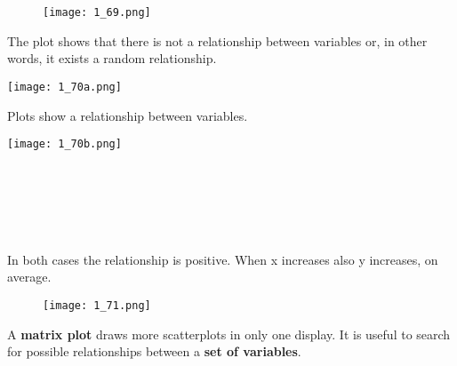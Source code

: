 \begin{frame}
  \begin{figure}
    \centering
    \texttt{[image: 1\_69.png]}
  \end{figure}
  \vspace*{.2cm}
  The plot shows that there is not a relationship between variables or, in other words, it exists a random relationship.
\end{frame}

\begin{frame}
  \begin{floatingfigure}[l]{6.5cm}
    \texttt{[image: 1\_70a.png]}\\
  \end{floatingfigure}
  \vspace*{.5cm}
  Plots show a relationship between variables.\\
  \begin{floatingfigure}[r]{6.5cm}
    \texttt{[image: 1\_70b.png]}\\
  \end{floatingfigure}
  \vspace*{1.5cm}
  \hspace*{.2cm}\\
  \hspace*{.2cm}\\
  \hspace*{.2cm}\\
  \hspace*{.2cm}\\
  \hspace*{.2cm}\\
  In both cases the relationship is positive. When x increases also y increases, on average.
\end{frame}

\begin{frame}
  \begin{figure}
    \centering
    \texttt{[image: 1\_71.png]}
  \end{figure}
  \vspace*{.2cm}
  A \textbf{matrix plot} draws more scatterplots in only one display. It is useful to search for possible relationships between a \textbf{set of variables}.
\end{frame}

